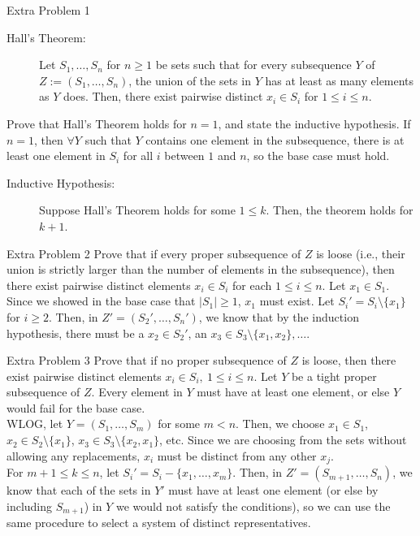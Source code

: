 \documentclass[8pt]{extarticle}
\begin{document}
  \begin{problem}{Extra Problem 1}
    \begin{description}
      \item[Hall's Theorem:] Let $S_1,\dots,S_n$ for $n\geq 1$ be sets such that for every subsequence $Y$ of  $Z:=(S_1,\dots,S_n)$, the union of the sets in $Y$ has at least as many elements as $Y$ does. Then, there exist pairwise distinct $x_i\in S_i$ for $1\leq i\leq n$.\\
    \end{description}

    Prove that Hall's Theorem holds for $n=1$, and state the inductive hypothesis.
    \tcblower
    If $n=1$, then $\forall Y$ such that $Y$ contains one element in the subsequence, there is at least one element in $S_i$ for all $i$ between $1$ and $n$, so the base case must hold.\\

    \begin{description}
      \item[Inductive Hypothesis:] Suppose Hall's Theorem holds for some $1\leq k$. Then, the theorem holds for $k+1$.
    \end{description}
  \end{problem}
  \begin{problem}{Extra Problem 2}
    Prove that if every proper subsequence of $Z$ is loose (i.e., their union is strictly larger than the number of elements in the subsequence), then there exist pairwise distinct elements $x_i\in S_i$ for each $1\leq i \leq n$.
    \tcblower
    Let $x_1\in S_1$. Since we showed in the base case that $|S_1| \geq 1$, $x_1$ must exist. Let $S_i' = S_i \setminus \{x_1\}$ for $i\geq 2$. Then, in $Z' = (S_2',\dots,S_n')$, we know that by the induction hypothesis, there must be a $x_2\in S_2'$, an $x_3\in S_3\setminus \{x_1,x_2\},\dots$.
  \end{problem}
  \begin{problem}{Extra Problem 3}
    Prove that if no proper subsequence of $Z$ is loose, then there exist pairwise distinct elements $x_i\in S_i,~1\leq i \leq n$.
    \tcblower
    Let $Y$ be a tight proper subsequence of $Z$. Every element in $Y$ must have at least one element, or else $Y$ would fail for the base case.\\

    WLOG, let $Y = (S_1,\dots,S_m)$ for some $m < n$. Then, we choose $x_1\in S_1$, $x_2 \in S_2\setminus \{x_1\}$, $x_3\in S_3\setminus\{x_2,x_1\}$, etc. Since we are choosing from the sets without allowing any replacements, $x_i$ must be distinct from any other $x_j$.\\

    For $m+1\leq k \leq n$, let $S_i' = S_i - \{x_1,\dots,x_m\}$. Then, in $Z' = (S_{m+1},\dots,S_n)$, we know that each of the sets in $Y'$ must have at least one element (or else by including $S_{m+1}$) in $Y$ we would not satisfy the conditions), so we can use the same procedure to select a system of distinct representatives.
  \end{problem}
\end{document}
